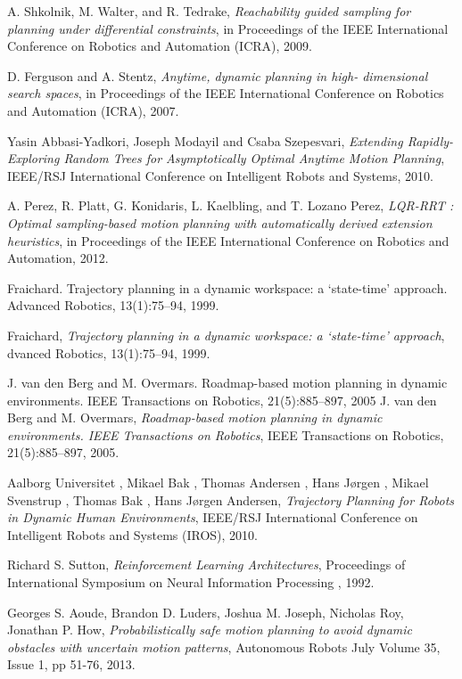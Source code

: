 \documentclass[MTech]{iitmdiss}
\begin{document}
\begin{thebibliography}{99}
	 A. Shkolnik, M. Walter, and R. Tedrake,
  \emph{Reachability guided sampling for planning under differential constraints},
	in Proceedings of the IEEE International Conference on Robotics and Automation (ICRA),
	2009.	

	D. Ferguson and A. Stentz,
  \emph{Anytime, dynamic planning in high- dimensional search spaces},
	in Proceedings of the IEEE International Conference on Robotics and Automation (ICRA),
	2007.	
	

	Yasin Abbasi-Yadkori, Joseph Modayil and Csaba Szepesvari,
  \emph{Extending Rapidly-Exploring Random Trees for Asymptotically Optimal Anytime Motion Planning},
	IEEE/RSJ International Conference on Intelligent Robots and Systems,
	2010.	

	A. Perez, R. Platt, G. Konidaris, L. Kaelbling, and T. Lozano Perez,
  \emph{LQR-RRT : Optimal sampling-based motion planning with automatically derived extension heuristics},
	in Proceedings of the IEEE International Conference on Robotics and Automation,
	2012.	
	
	
	
	
	
Fraichard. Trajectory planning in a dynamic workspace: a ‘state-time’ approach. Advanced Robotics, 13(1):75–94, 1999.

	Fraichard,
  \emph{Trajectory planning in a dynamic workspace: a ‘state-time’ approach},
	dvanced Robotics, 13(1):75–94, 
	1999.
	
J. van den Berg and M. Overmars. Roadmap-based motion planning in dynamic environments. IEEE Transactions on Robotics, 21(5):885–897, 2005 
	J. van den Berg and M. Overmars,
  \emph{Roadmap-based motion planning in dynamic environments. IEEE Transactions on Robotics},
	 IEEE Transactions on Robotics, 21(5):885–897, 
	 2005.
	 
	 
	Aalborg Universitet , Mikael Bak , Thomas Andersen , Hans Jørgen , Mikael Svenstrup , Thomas Bak , Hans Jørgen Andersen,
  \emph{Trajectory Planning for Robots in Dynamic Human Environments},
	IEEE/RSJ International Conference on Intelligent Robots and Systems (IROS), 
	2010.
	
	Richard S. Sutton,
  \emph{Reinforcement Learning Architectures},
	Proceedings of International Symposium on Neural Information Processing , 
	1992.
	
	Georges S. Aoude, Brandon D. Luders, Joshua M. Joseph, Nicholas Roy, Jonathan P. How,
  \emph{Probabilistically safe motion planning to avoid dynamic obstacles with uncertain motion patterns},
	Autonomous Robots
	July Volume 35, Issue 1, pp 51-76,
	2013.	
	


\end{thebibliography}
\end{document}

